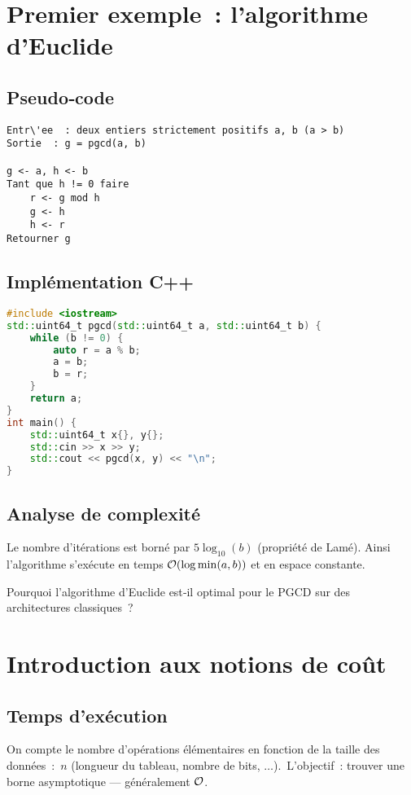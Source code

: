\section{Premier exemple : l'algorithme d'Euclide}

\subsection{Pseudo‑code}
\begin{lstlisting}[caption={Algorithme d'Euclide (version itérative)}]
Entr\'ee  : deux entiers strictement positifs a, b (a > b)
Sortie  : g = pgcd(a, b)

g <- a, h <- b
Tant que h != 0 faire
    r <- g mod h
    g <- h
    h <- r
Retourner g
\end{lstlisting}

\subsection{Implémentation C++}
\begin{lstlisting}[language=C++,caption=euclid.cpp]
#include <iostream>
std::uint64_t pgcd(std::uint64_t a, std::uint64_t b) {
    while (b != 0) {
        auto r = a % b;
        a = b;
        b = r;
    }
    return a;
}
int main() {
    std::uint64_t x{}, y{};
    std::cin >> x >> y;
    std::cout << pgcd(x, y) << "\n";
}
\end{lstlisting}

\subsection{Analyse de complexité}
Le nombre d'itérations est borné par \(5\log_{10}(b)\) (propriété de Lamé).
Ainsi l'algorithme s'exécute en temps \(\mathcal{O}(\log\min(a,b))\) et en espace
constante.

\begin{reflexion}
Pourquoi l'algorithme d'Euclide est‑il \og optimal \fg{} pour le
\textsc{PGCD} sur des architectures classiques ?
\end{reflexion}

\section{Introduction aux notions de coût}

\subsection{Temps d'exécution}
On compte le nombre d'opérations élémentaires en fonction de la taille des
données :\ \(n\) (longueur du tableau, nombre de bits, $\dots$). L'objectif :
trouver une borne asymptotique — généralement $\mathcal{O}$.

